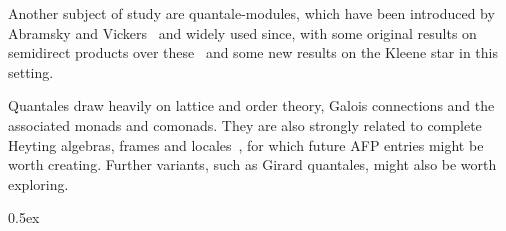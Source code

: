 \documentclass[11pt,a4paper]{article}
\begin{document}
Another subject of study are quantale-modules, which have been
introduced by Abramsky and Vickers~\cite{AbramskyV93} and widely used
since, with some original results on semidirect products over
these~\cite{DongolHS17} and some new results on the Kleene star in
this setting.

Quantales draw heavily on lattice and order theory, Galois connections
and the associated monads and comonads. They are also strongly related
to complete Heyting algebras, frames and locales~\cite{Johnstone82},
for which future AFP entries might be worth creating.  Further
variants, such as Girard quantales, might also be worth exploring.

\parindent 0pt\parskip 0.5ex





\end{document}
